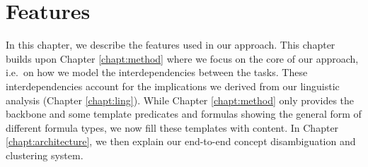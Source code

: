 \chapter{Features}
\label{chapt:features}

In this chapter, we describe the features used in our approach. This chapter
builds upon Chapter \ref{chapt:method} where we focus on the core of
our approach, i.e.\ on how we model the interdependencies between the
tasks. These interdependencies account for the implications we derived
from our linguistic analysis (Chapter \ref{chapt:ling}). While Chapter
\ref{chapt:method} only provides the backbone and some template
predicates and formulas showing the general form of different formula
types, we now fill these templates with content. In Chapter
\ref{chapt:architecture}, we then explain our end-to-end concept
disambiguation and clustering system.
